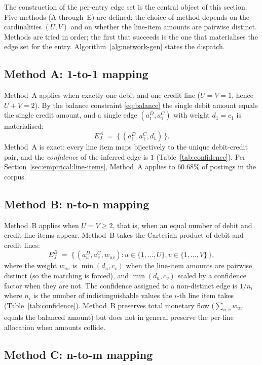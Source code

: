 The construction of the per-entry edge set is the central object of
this section.  Five methods (A through~E) are defined; the choice
of method depends on the cardinalities $(U, V)$ and on whether the
line-item amounts are pairwise distinct.  Methods are tried in
order; the first that succeeds is the one that materialises the edge
set for the entry.  Algorithm~\ref{alg:network-gen} states the
dispatch.

\subsection{Method A: 1-to-1 mapping}
\label{sec:network:A}

Method~A applies when exactly one debit and one credit line
($U = V = 1$, hence $U + V = 2$).  By the balance constraint
\eqref{eq:balance} the single debit amount equals the single credit
amount, and a single edge $(a^D_1, a^C_1)$ with weight $d_1 = c_1$
is materialised:
\[
  E_J^A \;=\; \{\, (a^D_1, a^C_1, d_1) \,\}.
\]
Method~A is exact: every line item maps bijectively to the unique
debit-credit pair, and the \emph{confidence} of the inferred edge
is $1$ (Table~\ref{tab:confidence}).  Per
Section~\ref{sec:empirical:line-items}, Method~A applies to
$60.68\%$ of postings in the corpus.

\subsection{Method B: n-to-n mapping}
\label{sec:network:B}

Method~B applies when $U = V \geq 2$, that is, when an equal
number of debit and credit line items appear.  Method~B takes the
Cartesian product of debit and credit lines:
\[
  E_J^B \;=\; \big\{\, (a^D_u, a^C_v, w_{uv}) :
    u \in \{1,\ldots,U\}, v \in \{1,\ldots,V\} \,\big\},
\]
where the weight $w_{uv}$ is $\min(d_u, c_v)$ when the line-item
amounts are pairwise distinct (so the matching is forced), and
$\min(d_u, c_v)$ scaled by a confidence factor when they are not.
The confidence assigned to a non-distinct edge is
$1/n_i$ where $n_i$ is the number of indistinguishable values the
$i$-th line item takes (Table~\ref{tab:confidence}).  Method~B
preserves total monetary flow ($\sum_{u,v} w_{uv}$ equals the
balanced amount) but does not in general preserve the per-line
allocation when amounts collide.

\subsection{Method C: n-to-m mapping}
\label{sec:network:C}


